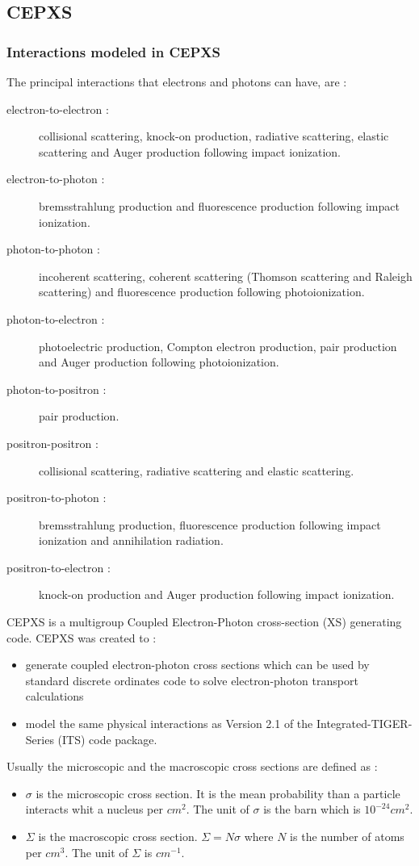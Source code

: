 \subsection{CEPXS}
\subsubsection{Interactions modeled in CEPXS}
The principal interactions that electrons and photons can have, are
\cite{cepxs} :
\begin{description}
\item [electron-to-electron :] collisional scattering, knock-on production,
radiative scattering, elastic scattering and Auger production following impact
ionization.
\item [electron-to-photon :] bremsstrahlung production and fluorescence
production following impact ionization.
\item [photon-to-photon :] incoherent scattering, coherent scattering (Thomson 
scattering and Raleigh scattering) and fluorescence production following
photoionization.
\item [photon-to-electron :] photoelectric production, Compton electron
production, pair production and Auger production following photoionization.
\item [photon-to-positron :] pair production.
\item [positron-positron :] collisional scattering, radiative scattering and
elastic scattering.
\item [positron-to-photon :] bremsstrahlung production, fluorescence
production following impact ionization and annihilation radiation.
\item [positron-to-electron :] knock-on production and Auger production
following impact ionization.
\end{description}
CEPXS is a multigroup Coupled Electron-Photon cross-section (XS) generating
code. CEPXS was created to \cite{cepxs} :
\begin{itemize}
\item generate coupled electron-photon cross sections which can be used by
standard discrete ordinates code to solve electron-photon transport
calculations
\item model the same physical interactions as Version 2.1 of the
Integrated-TIGER-Series (ITS) code package.
\end{itemize}
Usually the microscopic and the macroscopic cross sections are defined as 
\cite{barjon} :
\begin{itemize}
\item $\sigma$ is the microscopic cross section. It is the mean probability than a
particle interacts whit a nucleus per $cm^2$. The unit of $\sigma$ is the barn
which is $10^{-24}cm^2$.
\item $\Sigma$ is the macroscopic cross section. $\Sigma = N \sigma$ where $N$
is the number of atoms per $cm^3$. The unit of $\Sigma$ is $cm^{-1}$.
\end{itemize}
